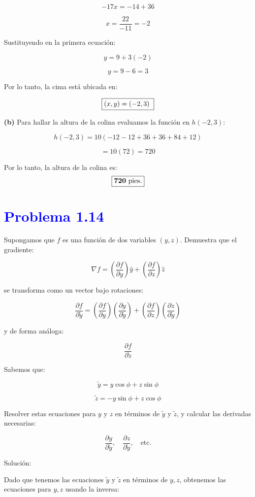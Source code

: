 \documentclass[12pt]{article}
\newcommand{\question}[1]{\textcolor{blue}{\textbf{#1}}}
\begin{document}
\[-17x = -14 + 36\]

\[x = \frac{22}{-11} = -2\]

Sustituyendo en la primera ecuación:

\[y = 9 + 3(-2)\]

\[y = 9 - 6 = 3\]

Por lo tanto, la cima está ubicada en:

\[\fbox{$ (x,y) = (-2,3) $ }\]

\textbf{(b)} Para hallar la altura de la colina evaluamos la función en \( h(-2,3) \):

\[h(-2,3) = 10 \left( -12 -12 + 36 + 36 + 84 + 12 \right)\]

\[= 10 (72) = 720\]

Por lo tanto, la altura de la colina es:\[ \fbox{$ \mathbf{720} \text{ pies.} $}\]

\section*{ \question{Problema 1.14}} Supongamos que \( f \) es una función de dos variables \( (y, z) \). Demuestra que el gradiente:  

\[
\nabla f = \left( \frac{\partial f}{\partial y} \right) \hat{y} + \left( \frac{\partial f}{\partial z} \right) \hat{z}
\]

se transforma como un vector bajo rotaciones:

\[
\frac{\partial f}{\partial \tilde{y}} = \left( \frac{\partial f}{\partial y} \right) \left( \frac{\partial y}{\partial \tilde{y}} \right) + \left( \frac{\partial f}{\partial z} \right) \left( \frac{\partial z}{\partial \tilde{y}} \right)
\]

y de forma análoga:

\[
\frac{\partial f}{\partial \tilde{z}}
\]

Sabemos que:

\[
\tilde{y} = y \cos \phi + z \sin \phi
\]

\[
\tilde{z} = -y \sin \phi + z \cos \phi
\]

Resolver estas ecuaciones para \( y \) y \( z \) en términos de \( \tilde{y} \) y \( \tilde{z} \), y calcular las derivadas necesarias:

\[
\frac{\partial y}{\partial \tilde{y}}, \quad \frac{\partial z}{\partial \tilde{y}}, \quad \text{etc.}
\]

Solución:

Dado que tenemos las ecuaciones \( \tilde{y} \) y \( \tilde{z} \) en términos de \( y, z \),  
obtenemos las ecuaciones para \( y, z \) usando la inversa:
\end{document}
